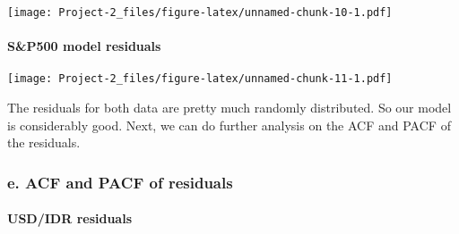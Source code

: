 \documentclass[]{article}
\newenvironment{Shaded}{\begin{snugshade}}{\end{snugshade}}
\newcommand{\KeywordTok}[1]{\textcolor[rgb]{0.13,0.29,0.53}{\textbf{#1}}}
\newcommand{\DataTypeTok}[1]{\textcolor[rgb]{0.13,0.29,0.53}{#1}}
\newcommand{\StringTok}[1]{\textcolor[rgb]{0.31,0.60,0.02}{#1}}
\newcommand{\OperatorTok}[1]{\textcolor[rgb]{0.81,0.36,0.00}{\textbf{#1}}}
\newcommand{\NormalTok}[1]{#1}
\let\oldparagraph\paragraph
\renewcommand{\paragraph}[1]{\oldparagraph{#1}\mbox{}}
\begin{document}
\begin{Shaded}
\end{Shaded}

\texttt{[image: Project-2\_files/figure-latex/unnamed-chunk-10-1.pdf]}

\paragraph{S\&P500 model residuals}\label{sp500-model-residuals}

\begin{Shaded}
\end{Shaded}

\texttt{[image: Project-2\_files/figure-latex/unnamed-chunk-11-1.pdf]}

The residuals for both data are pretty much randomly distributed. So our
model is considerably good. Next, we can do further analysis on the ACF
and PACF of the residuals.

\subsubsection{e. ACF and PACF of
residuals}\label{e.-acf-and-pacf-of-residuals}

\paragraph{USD/IDR residuals}\label{usdidr-residuals}
\end{document}
